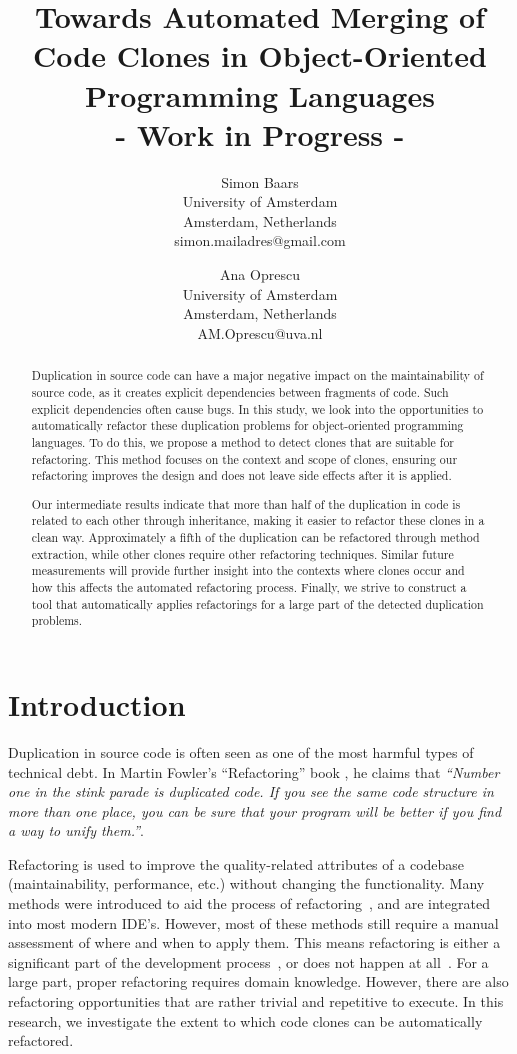 \documentclass[a4paper]{article}
\title{Towards Automated Merging of Code Clones in Object-Oriented Programming Languages\\- Work in Progress -}
\author{
Simon Baars \\ University of Amsterdam\\
                Amsterdam, Netherlands \\ simon.mailadres@gmail.com
\and
Ana Oprescu \\ University of Amsterdam\\
                Amsterdam, Netherlands \\
                AM.Oprescu@uva.nl
}
\begin{document}
\maketitle

\begin{abstract}
Duplication in source code can have a major negative impact on the maintainability of source code, as it creates explicit dependencies between fragments of code. Such explicit dependencies often cause bugs. In this study, we look into the opportunities to automatically refactor these duplication problems for object-oriented programming languages. To do this, we propose a method to detect clones that are suitable for refactoring. This method focuses on the context and scope of clones, ensuring our refactoring improves the design and does not leave side effects after it is applied.

Our intermediate results indicate that more than half of the duplication in code is related to each other through inheritance, making it easier to refactor these clones in a clean way. Approximately a fifth of the duplication can be refactored through method extraction, while other clones require other refactoring techniques. Similar future measurements will provide further insight into the contexts where clones occur and how this affects the automated refactoring process. Finally, we strive to construct a tool that automatically applies refactorings for a large part of the detected duplication problems.
\end{abstract}

\section{Introduction}
Duplication in source code is often seen as one of the most harmful types of technical debt. In Martin Fowler's ``Refactoring'' book \cite{fowler1999refactoring}, he claims that \textit{``Number one in the stink parade is duplicated code. If you see the same code structure in more than one place, you can be sure that your program will be better if you find a way to unify them.''}.

Refactoring is used to improve the quality-related attributes of a codebase (maintainability, performance, etc.) without changing the functionality. Many methods were introduced to aid the process of refactoring~\cite{fowler1999refactoring, wake2004refactoring}, and are integrated into most modern IDE's. However, most of these methods still require a manual assessment of where and when to apply them. This means refactoring is either a significant part of the development process~\cite{lientz1978characteristics, mens2004survey}, or does not happen at all~\cite{mens2003refactoring}. For a large part, proper refactoring requires domain knowledge. However, there are also refactoring opportunities that are rather trivial and repetitive to execute. In this research, we investigate the extent to which code clones can be automatically refactored.
\end{document}
